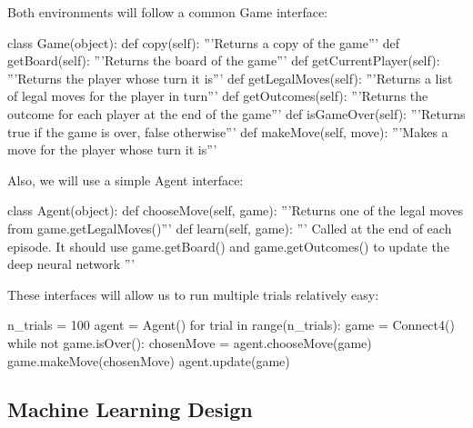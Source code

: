 \documentclass{article}
\begin{document}
\noindent Both environments will follow a common \textrm{Game} interface:

\begin{python}
class Game(object):
    def copy(self):
        '''Returns a copy of the game'''
    def getBoard(self):
        '''Returns the board of the game'''
    def getCurrentPlayer(self):
        '''Returns the player whose turn it is'''
    def getLegalMoves(self):
        '''Returns a list of legal moves for the player in turn'''
    def getOutcomes(self):
        '''Returns the outcome for each player at the end of the game'''
    def isGameOver(self):
        '''Returns true if the game is over, false otherwise'''
    def makeMove(self, move):
        '''Makes a move for the player whose turn it is'''
\end{python}

\noindent Also, we will use a simple \textrm{Agent} interface:

\begin{python}
class Agent(object):
    def chooseMove(self, game):
        '''Returns one of the legal moves from game.getLegalMoves()'''
    def learn(self, game):
        '''
        Called at the end of each episode. It should use game.getBoard()
        and game.getOutcomes() to update the deep neural network
        '''

\end{python}

\noindent
These interfaces will allow us to run multiple trials relatively easy:

\begin{python}
n_trials = 100
agent = Agent()
for trial in range(n_trials):
    game = Connect4()
    while not game.isOver():
        chosenMove = agent.chooseMove(game)
        game.makeMove(chosenMove)
    agent.update(game)
\end{python}

\subsection{Machine Learning Design}
\end{document}

